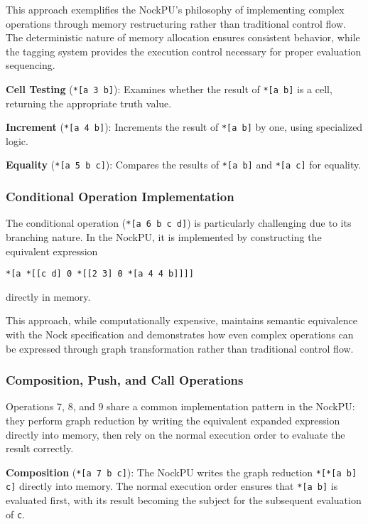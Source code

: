 \documentclass[twoside]{article}
\begin{document}


This approach exemplifies the NockPU's philosophy of implementing complex operations through memory restructuring rather than traditional control flow. The deterministic nature of memory allocation ensures consistent behavior, while the tagging system provides the execution control necessary for proper evaluation sequencing.

\textbf{Cell Testing} (\texttt{*[a 3 b]}): Examines whether the result of \texttt{*[a b]} is a cell, returning the appropriate truth value.

\textbf{Increment} (\texttt{*[a 4 b]}): Increments the result of \texttt{*[a b]} by one, using specialized logic.

\textbf{Equality} (\texttt{*[a 5 b c]}): Compares the results of \texttt{*[a b]} and \texttt{*[a c]} for equality.

\subsubsection{Conditional Operation Implementation}

The conditional operation (\texttt{*[a 6 b c d]}) is particularly challenging due to its branching nature. In the NockPU, it is implemented by constructing the equivalent expression 
\begin{lstlisting}[style=listingblock]
*[a *[[c d] 0 *[[2 3] 0 *[a 4 4 b]]]]
\end{lstlisting}
directly in memory.

This approach, while computationally expensive, maintains semantic equivalence with the Nock specification and demonstrates how even complex operations can be expressed through graph transformation rather than traditional control flow.

\subsubsection{Composition, Push, and Call Operations}

Operations 7, 8, and 9 share a common implementation pattern in the NockPU: they perform graph reduction by writing the equivalent expanded expression directly into memory, then rely on the normal execution order to evaluate the result correctly.

\textbf{Composition} (\texttt{*[a 7 b c]}): The NockPU writes the graph reduction \texttt{*[*[a b] c]} directly into memory. The normal execution order ensures that \texttt{*[a b]} is evaluated first, with its result becoming the subject for the subsequent evaluation of \texttt{c}.
\end{document}
